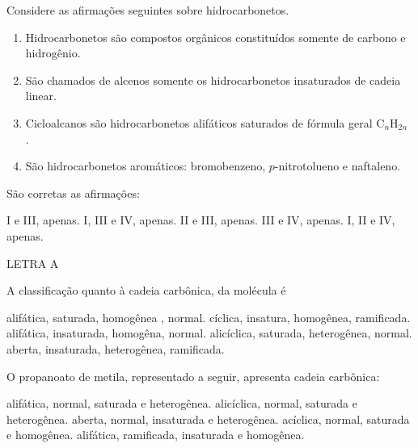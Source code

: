 \documentclass[10pt]{scrartcl}
\begin{document}
\begin{exercise}[points=1.0]
Considere as afirmações seguintes sobre hidrocarbonetos.

\begin{enumerate}[label=\Roman*)]
\item Hidrocarbonetos são compostos orgânicos constituídos somente de carbono e hidrogênio.
\item São chamados de alcenos somente os hidrocarbonetos insaturados de cadeia linear.
\item Cicloalcanos são hidrocarbonetos alifáticos saturados de fórmula geral  C$_{n}$H$_{2n}$ .
\item São hidrocarbonetos aromáticos: bromobenzeno,  $p$-nitrotolueno e naftaleno.
\end{enumerate}

São corretas as afirmações:
\begin{choice}
\choice I e III, apenas.
\choice I, III e IV, apenas.
\choice II e III, apenas.
\choice III e IV, apenas.
\choice I, II e IV, apenas.
\end{choice}
\end{exercise}
\begin{solution}
LETRA A
\end{solution}


\begin{exercise}[points=1.0]
A classificação quanto à cadeia carbônica, da molécula é
\begin{center}
\end{center}
\begin{choice}
\choice alifática, saturada, homogênea , normal.
\choice cíclica, insatura, homogênea, ramificada.
\choice alifática, insaturada, homogêna, normal.
\choice alicíclica, saturada, heterogênea, normal.
\choice aberta, insaturada, heterogênea, ramificada.
\end{choice}
\end{exercise}





\begin{exercise}[points=1.0]
O propanoato de metila, representado a seguir, apresenta cadeia carbônica:
\begin{center}
\end{center}
\begin{choice}
\choice alifática, normal, saturada e heterogênea.
\choice alicíclica, normal, saturada e heterogênea.
\choice aberta, normal, insaturada e heterogênea.
\choice acíclica, normal, saturada e homogênea.
\choice alifática, ramificada, insaturada e homogênea.
\end{choice}
\end{exercise}
\end{document}
